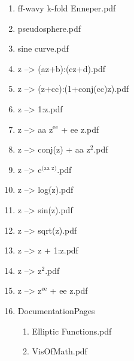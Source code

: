 \documentclass[11pt]{article}
\begin{document}
\begin{enumerate}
\begin{enumerate}
\item ff-wavy k-fold Enneper.pdf
\label{sec-1-1-1-1-29-20-152}

\item pseudosphere.pdf
\label{sec-1-1-1-1-29-20-153}

\item sine curve.pdf
\label{sec-1-1-1-1-29-20-154}

\item z --> (az+b):(cz+d).pdf
\label{sec-1-1-1-1-29-20-155}

\item z --> (z+cc):(1+conj(cc)z).pdf
\label{sec-1-1-1-1-29-20-156}

\item z --> 1:z.pdf
\label{sec-1-1-1-1-29-20-157}

\item z --> aa z$^{\text{ee}}$ + ee z.pdf
\label{sec-1-1-1-1-29-20-158}

\item z --> conj(z) + aa z$^{\text{2}}$.pdf
\label{sec-1-1-1-1-29-20-159}

\item z --> e$^{\text{(aa z)}}$.pdf
\label{sec-1-1-1-1-29-20-160}

\item z --> log(z).pdf
\label{sec-1-1-1-1-29-20-161}

\item z --> sin(z).pdf
\label{sec-1-1-1-1-29-20-162}

\item z --> sqrt(z).pdf
\label{sec-1-1-1-1-29-20-163}

\item z --> z + 1:z.pdf
\label{sec-1-1-1-1-29-20-164}

\item z --> z$^{\text{2}}$.pdf
\label{sec-1-1-1-1-29-20-165}

\item z --> z$^{\text{ee}}$ + ee z.pdf
\label{sec-1-1-1-1-29-20-166}

\item DocumentationPages
\label{sec-1-1-1-1-29-20-167}
\begin{enumerate}
\item Elliptic Functions.pdf
\label{sec-1-1-1-1-29-20-167-1}

\item VisOfMath.pdf
\label{sec-1-1-1-1-29-20-167-2}
\end{enumerate}
\end{enumerate}


\end{enumerate}
\end{document}
